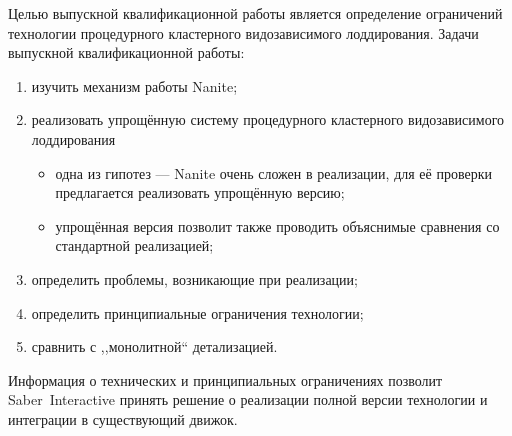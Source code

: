 Целью выпускной квалификационной работы является определение ограничений технологии процедурного кластерного видозависимого лоддирования.
Задачи выпускной квалификационной работы:
\begin{enumerate}
    \item изучить механизм работы Nanite;
    \item реализовать упрощённую систему процедурного кластерного видозависимого лоддирования
    \begin{itemize}
        \item одна из гипотез --- Nanite очень сложен в реализации, для её проверки предлагается реализовать упрощённую версию;
        \item упрощённая версия позволит также проводить объяснимые сравнения со стандартной реализацией;
    \end{itemize}
    \item определить проблемы, возникающие при реализации;
    \item определить принципиальные ограничения технологии;
    \item сравнить с ,,монолитной`` детализацией.
\end{enumerate}

Информация о технических и принципиальных ограничениях позволит Saber~Interactive принять решение о реализации полной версии технологии и интеграции в существующий движок.
